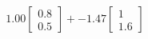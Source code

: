 \documentclass[preview]{standalone}
\begin{document}
\begin{align*}
1.00 \begin{bmatrix} 0.8 \\ 0.5 \end{bmatrix} + -1.47 \begin{bmatrix} 1 \\ 1.6 \end{bmatrix}
\end{align*}
\end{document}
